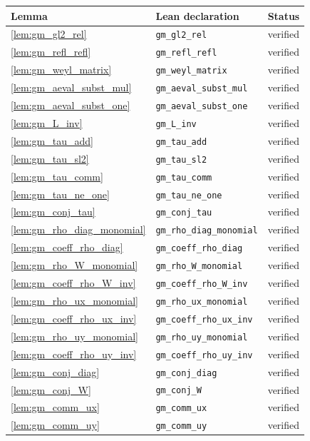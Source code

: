 \documentclass[11pt]{article}
\theoremstyle{definition}
\theoremstyle{remark}
\begin{document}
\begin{longtable}{@{}lll@{}}
\toprule
Lemma & Lean declaration & Status \\
\midrule
\endhead
\cref{lem:gm_gl2_rel} & \texttt{gm\_gl2\_rel} & verified \\
\cref{lem:gm_refl_refl} & \texttt{gm\_refl\_refl} & verified \\
\cref{lem:gm_weyl_matrix} & \texttt{gm\_weyl\_matrix} & verified \\
\cref{lem:gm_aeval_subst_mul} & \texttt{gm\_aeval\_subst\_mul} & verified \\
\cref{lem:gm_aeval_subst_one} & \texttt{gm\_aeval\_subst\_one} & verified \\
\cref{lem:gm_L_inv} & \texttt{gm\_L\_inv} & verified \\
\cref{lem:gm_tau_add} & \texttt{gm\_tau\_add} & verified \\
\cref{lem:gm_tau_sl2} & \texttt{gm\_tau\_sl2} & verified \\
\cref{lem:gm_tau_comm} & \texttt{gm\_tau\_comm} & verified \\
\cref{lem:gm_tau_ne_one} & \texttt{gm\_tau\_ne\_one} & verified \\
\cref{lem:gm_conj_tau} & \texttt{gm\_conj\_tau} & verified \\
\cref{lem:gm_rho_diag_monomial} & \texttt{gm\_rho\_diag\_monomial} & verified \\
\cref{lem:gm_coeff_rho_diag} & \texttt{gm\_coeff\_rho\_diag} & verified \\
\cref{lem:gm_rho_W_monomial} & \texttt{gm\_rho\_W\_monomial} & verified \\
\cref{lem:gm_coeff_rho_W_inv} & \texttt{gm\_coeff\_rho\_W\_inv} & verified \\
\cref{lem:gm_rho_ux_monomial} & \texttt{gm\_rho\_ux\_monomial} & verified \\
\cref{lem:gm_coeff_rho_ux_inv} & \texttt{gm\_coeff\_rho\_ux\_inv} & verified \\
\cref{lem:gm_rho_uy_monomial} & \texttt{gm\_rho\_uy\_monomial} & verified \\
\cref{lem:gm_coeff_rho_uy_inv} & \texttt{gm\_coeff\_rho\_uy\_inv} & verified \\
\cref{lem:gm_conj_diag} & \texttt{gm\_conj\_diag} & verified \\
\cref{lem:gm_conj_W} & \texttt{gm\_conj\_W} & verified \\
\cref{lem:gm_comm_ux} & \texttt{gm\_comm\_ux} & verified \\
\cref{lem:gm_comm_uy} & \texttt{gm\_comm\_uy} & verified \\

\end{longtable}
\end{document}

